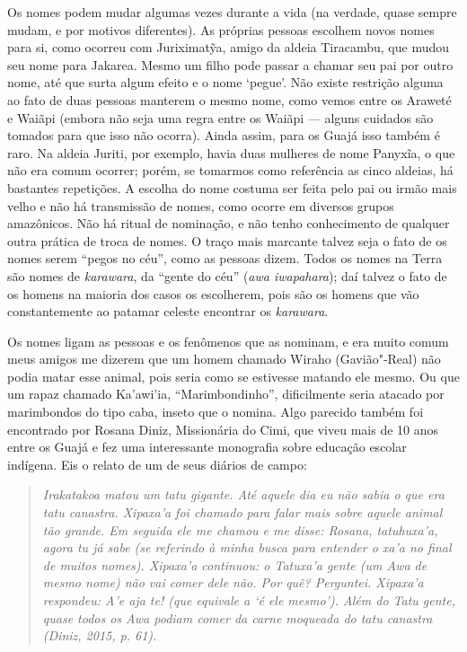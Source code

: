 Os nomes podem mudar algumas vezes durante a vida (na verdade, quase
sempre mudam, e por motivos diferentes). As próprias pessoas escolhem
novos nomes para si, como ocorreu com Juriximatỹa, amigo da aldeia
Tiracambu, que mudou seu nome para Jakarea. Mesmo um filho pode passar a
chamar seu pai por outro nome, até que surta algum efeito e o nome
`pegue'. Não existe restrição alguma ao fato de duas pessoas manterem o
mesmo nome, como vemos entre os Araweté e Waiãpi (embora não seja uma
regra entre os Waiãpi --- alguns cuidados são tomados para que isso não
ocorra). Ainda assim, para os Guajá isso também é raro. Na aldeia
Juriti, por exemplo, havia duas mulheres de nome Panyxĩa, o que não era
comum ocorrer; porém, se tomarmos como referência as cinco aldeias, há
bastantes repetições. A escolha do nome costuma ser feita pelo pai ou
irmão mais velho e não há transmissão de nomes, como ocorre em diversos
grupos amazônicos. Não há ritual de nominação, e não tenho conhecimento
de qualquer outra prática de troca de nomes. O traço mais marcante
talvez seja o fato de os nomes serem ``pegos no céu'', como as pessoas
dizem. Todos os nomes na Terra são nomes de \emph{karawara}, da ``gente
do céu'' (\emph{awa iwapahara}); daí talvez o fato de os homens na
maioria dos casos os escolherem, pois são os homens que vão
constantemente ao patamar celeste encontrar os \emph{karawara}.

Os nomes ligam as pessoas e os fenômenos que as nominam, e era muito
comum meus amigos me dizerem que um homem chamado Wiraho (Gavião"-Real)
não podia matar esse animal, pois seria como se estivesse matando ele
mesmo. Ou que um rapaz chamado Ka'awi'ia, ``Marimbondinho'',
dificilmente seria atacado por marimbondos do tipo caba, inseto que o
nomina. Algo parecido também foi encontrado por Rosana Diniz,
Missionária do Cimi, que viveu mais de 10 anos entre os Guajá e fez uma
interessante monografia sobre educação escolar indígena. Eis o relato de um de seus diários de campo:

\begin{quote}
\emph{Irakatakoa matou um tatu gigante. Até aquele dia eu não sabia o que era
tatu canastra. Xipaxa'a foi chamado para falar mais sobre aquele animal
tão grande. Em seguida ele me chamou e me disse: Rosana, tatuhuxa'a,
agora tu já sabe (se referindo à minha busca para entender o \emph{xa'a}
no final de muitos nomes). Xipaxa'a continuou: o Tatuxa'a gente (um Awa
de mesmo nome) não vai comer dele não. Por quê? Perguntei. Xipaxa'a
respondeu: \emph{A'e aja te!} (que equivale a `é ele mesmo'). Além do
Tatu gente, quase todos os Awa podiam comer da carne moqueada do tatu
canastra (Diniz, 2015, p. 61).}
\end{quote}

